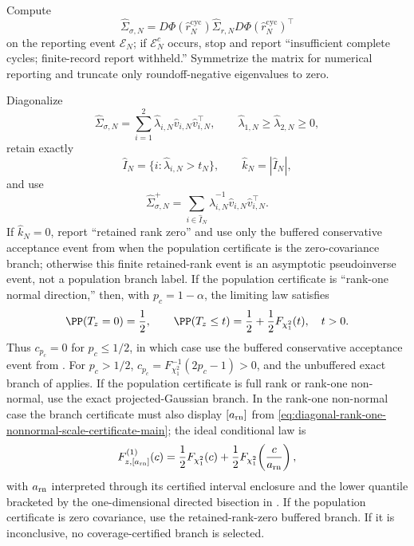 Compute
\[
\widehat\Sigma_{\sigma,N}
=D\Phi(\widehat r_N^{\mathrm{cyc}})
 \widehat\Sigma_{r,N}
 D\Phi(\widehat r_N^{\mathrm{cyc}})^\top
\]
on the reporting event \(\mathcal E_N\); if \(\mathcal E_N^c\) occurs, stop
and report ``insufficient complete cycles; finite-record report withheld.''  Symmetrize
the matrix for numerical reporting and truncate only roundoff-negative
eigenvalues to zero.

Diagonalize
\[
\widehat\Sigma_{\sigma,N}
=\sum_{i=1}^2\widehat\lambda_{i,N}
\widehat v_{i,N}\widehat v_{i,N}^{\top},
\qquad
\widehat\lambda_{1,N}\ge\widehat\lambda_{2,N}\ge0,
\]
retain exactly
\[
\widehat I_N=\{i:\widehat\lambda_{i,N}>t_N\},
\qquad \widehat k_N=|\widehat I_N|,
\]
and use
\[
\widehat\Sigma_{\sigma,N}^{+}
=\sum_{i\in\widehat I_N}
\widehat\lambda_{i,N}^{-1}
\widehat v_{i,N}\widehat v_{i,N}^{\top}.
\]
If \(\widehat k_N=0\), report ``retained rank zero'' and use only the
buffered conservative acceptance event from
 when the population
certificate is the zero-covariance branch; otherwise this finite retained-rank
event is an asymptotic pseudoinverse event, not a population branch label.  If
the population certificate is ``rank-one normal direction,'' then, with
\(p_c=1-\alpha\),
the limiting law satisfies
\[
\PP(T_z=0)=\frac12,\qquad
\PP(T_z\le t)=\frac12+\frac12F_{\chi^2_1}(t),\quad t>0.
\]
Thus \(c_{p_c}=0\) for \(p_c\le1/2\), in which case use the buffered
conservative acceptance event from
.  For \(p_c>1/2\),
\(c_{p_c}=F_{\chi^2_1}^{-1}(2p_c-1)>0\), and the unbuffered exact branch of
 applies.  If the population certificate is full rank or
rank-one non-normal, use the exact projected-Gaussian branch.  In the
rank-one non-normal case the branch certificate must also display
\([a_{\rm rn}]\) from
\eqref{eq:diagonal-rank-one-nonnormal-scale-certificate-main}; the ideal
conditional law is
\[
F^{(1)}_{z,[a_{\rm rn}]}(c)
=\frac12F_{\chi^2_1}(c)
 +\frac12F_{\chi^2_1}\!\left(\frac{c}{a_{\rm rn}}\right),
\]
with \(a_{\rm rn}\) interpreted through its certified interval enclosure and
the lower quantile bracketed by the one-dimensional directed bisection in
.  If
the population certificate is zero covariance, use the retained-rank-zero
buffered branch.  If it is inconclusive, no coverage-certified branch is
selected.

